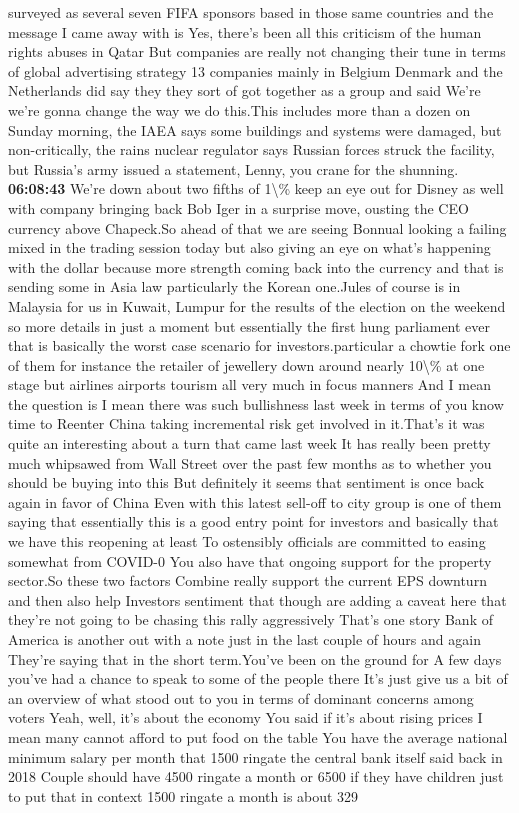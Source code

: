 \documentclass{article}%
\begin{document}
surveyed as several seven FIFA sponsors based in those same countries and the message I came away with is Yes, there's been all this criticism of the human rights abuses in Qatar But companies are really not changing their tune in terms of global advertising strategy 13 companies mainly in Belgium Denmark and the Netherlands did say they they sort of got together as a group and said We're we're gonna change the way we do this.This includes more than a dozen on Sunday morning, the IAEA says some buildings and systems were damaged, but non{-}critically, the rains nuclear regulator says Russian forces struck the facility, but Russia's army issued a statement, Lenny, you crane for the shunning.%
\textbf{06:08:43}%
\newline%
We're down about two fifths of 1\textbackslash{}\% keep an eye out for Disney as well with company bringing back Bob Iger in a surprise move, ousting the CEO currency above Chapeck.So ahead of that we are seeing Bonnual looking a failing mixed in the trading session today but also giving an eye on what's happening with the dollar because more strength coming back into the currency and that is sending some in Asia law particularly the Korean one.Jules of course is in Malaysia for us in Kuwait, Lumpur for the results of the election on the weekend so more details in just a moment but essentially the first hung parliament ever that is basically the worst case scenario for investors.particular a chowtie fork one of them for instance the retailer of jewellery down around nearly 10\textbackslash{}\% at one stage but airlines airports tourism all very much in focus manners And I mean the question is I mean there was such bullishness last week in terms of you know time to Reenter China taking incremental risk get involved in it.That's it was quite an interesting about a turn that came last week It has really been pretty much whipsawed from Wall Street over the past few months as to whether you should be buying into this But definitely it seems that sentiment is once back again in favor of China Even with this latest sell{-}off to city group is one of them saying that essentially this is a good entry point for investors and basically that we have this reopening at least To ostensibly officials are committed to easing somewhat from COVID{-}0 You also have that ongoing support for the property sector.So these two factors Combine really support the current EPS downturn and then also help Investors sentiment that though are adding a caveat here that they're not going to be chasing this rally aggressively That's one story Bank of America is another out with a note just in the last couple of hours and again They're saying that in the short term.You've been on the ground for A few days you've had a chance to speak to some of the people there It's just give us a bit of an overview of what stood out to you in terms of dominant concerns among voters Yeah, well, it's about the economy You said if it's about rising prices I mean many cannot afford to put food on the table You have the average national minimum salary per month that 1500 ringate the central bank itself said back in 2018 Couple should have 4500 ringate a month or 6500 if they have children just to put that in context 1500 ringate a month is about 329 
\end{document}
